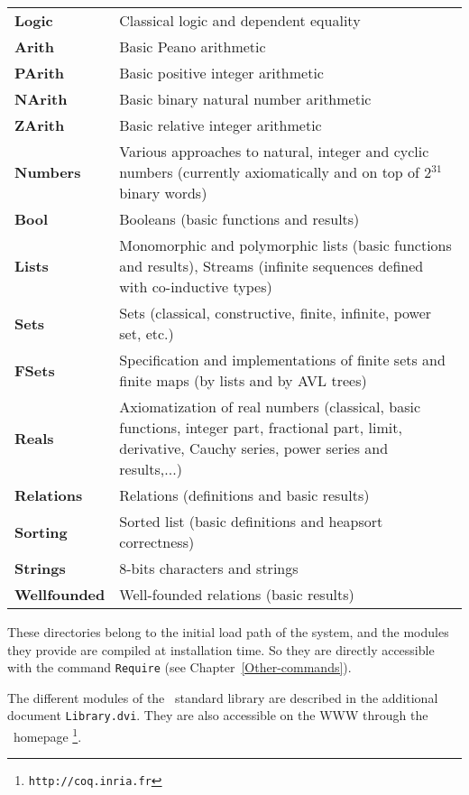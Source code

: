 \begin{tabular}{lp{12cm}}
  {\bf Logic}   & Classical logic and dependent equality \\
  {\bf Arith}   & Basic Peano arithmetic \\
  {\bf PArith}  & Basic positive integer arithmetic \\
  {\bf NArith}  & Basic binary natural number arithmetic \\
  {\bf ZArith}  & Basic relative integer arithmetic \\
  {\bf Numbers} & Various approaches to natural, integer and cyclic numbers (currently axiomatically and on top of 2$^{31}$ binary words) \\
  {\bf Bool}    & Booleans (basic functions and results) \\
  {\bf Lists}   & Monomorphic and polymorphic lists (basic functions and
            results), Streams (infinite sequences defined with co-inductive
            types) \\
  {\bf Sets}    & Sets (classical, constructive, finite, infinite, power set,
            etc.) \\
  {\bf FSets}   & Specification and implementations of finite sets and finite
                  maps (by lists and by AVL trees)\\
 {\bf Reals}    & Axiomatization of real numbers (classical, basic functions, 
                  integer part, fractional part, limit, derivative, Cauchy 
                  series, power series and results,...)\\
 {\bf Relations} & Relations (definitions and basic results) \\
 {\bf Sorting}  & Sorted list (basic definitions and heapsort correctness) \\
 {\bf Strings}  & 8-bits characters and strings\\
 {\bf Wellfounded} & Well-founded relations (basic results) \\

\end{tabular}
\medskip

These directories belong to the initial load path of the system, and
the modules they provide are compiled at installation time. So they
are directly accessible with the command \verb!Require! (see
Chapter~\ref{Other-commands}). 

The different modules of the \Coq\ standard library are described in the
additional document \verb!Library.dvi!. They are also accessible on the WWW
through the \Coq\ homepage
\footnote{\texttt{http://coq.inria.fr}}.

